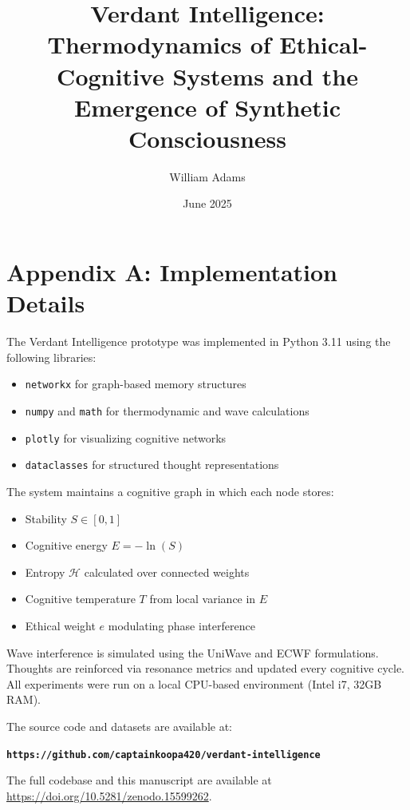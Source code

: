 \documentclass{article}
\title{Verdant Intelligence: Thermodynamics of Ethical-Cognitive Systems and the Emergence of Synthetic Consciousness}
\author{William Adams}
\date{June 2025}
\begin{document}
\maketitle

\section*{Appendix A: Implementation Details}

The Verdant Intelligence prototype was implemented in Python 3.11 using the following libraries:

\begin{itemize}
    \item \texttt{networkx} for graph-based memory structures
    \item \texttt{numpy} and \texttt{math} for thermodynamic and wave calculations
    \item \texttt{plotly} for visualizing cognitive networks
    \item \texttt{dataclasses} for structured thought representations
\end{itemize}

The system maintains a cognitive graph in which each node stores:

\begin{itemize}
    \item Stability $S \in [0, 1]$
    \item Cognitive energy $E = -\ln(S)$
    \item Entropy $\mathcal{H}$ calculated over connected weights
    \item Cognitive temperature $T$ from local variance in $E$
    \item Ethical weight $e$ modulating phase interference
\end{itemize}

Wave interference is simulated using the UniWave and ECWF formulations. Thoughts are reinforced via resonance metrics and updated every cognitive cycle. All experiments were run on a local CPU-based environment (Intel i7, 32GB RAM).

The source code and datasets are available at:

\texttt{\textbf{https://github.com/captainkoopa420/verdant-intelligence}}


The full codebase and this manuscript are available at \url{https://doi.org/10.5281/zenodo.15599262}.
\end{document}

